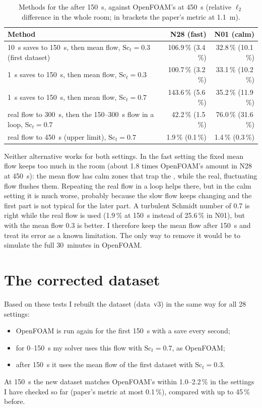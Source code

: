 \begin{table}[h]
  \centering
  \caption{Methods for the \cotwo{} after 150~s, against OpenFOAM's \cotwo{} at 450~s (relative $\ell_2$
  difference in the whole room; in brackets the paper's metric at 1.1~m).}
  \label{tab:after150}
  \small
  \begin{tabular}{>{\raggedright}p{8.2cm}rr}
    \toprule
    Method & N28 (fast) & N01 (calm)\\
    \midrule
    10~s saves to 150~s, then mean flow, $\mathrm{Sc}_t=0.3$ (first dataset) & 106.9\,\% (3.4\,\%) & 32.8\,\% (10.1\,\%)\\
    1~s saves to 150~s, then mean flow, $\mathrm{Sc}_t=0.3$ & 100.7\,\% (3.2\,\%) & 33.1\,\% (10.2\,\%)\\
    1~s saves to 150~s, then mean flow, $\mathrm{Sc}_t=0.7$ & 143.6\,\% (5.6\,\%) & 35.2\,\% (11.9\,\%)\\
    real flow to 300~s, then the 150--300~s flow in a loop, $\mathrm{Sc}_t=0.7$ & 42.2\,\% (1.5\,\%) & 76.0\,\% (31.6\,\%)\\
    real flow to 450~s (upper limit), $\mathrm{Sc}_t=0.7$ & 1.9\,\% (0.1\,\%) & 1.4\,\% (0.3\,\%)\\
    \bottomrule
  \end{tabular}
\end{table}

Neither alternative works for both settings. In the fast setting the fixed mean flow keeps too much
\cotwo{} in the room (about 1.8 times OpenFOAM's amount in N28 at 450~s): the mean flow has calm zones that trap the
\cotwo{}, while the real, fluctuating flow flushes them. Repeating the real flow in a loop helps there, but in
the calm setting it is much worse, probably because the slow flow keeps changing and the first part is not
typical for the later part. A turbulent Schmidt number of 0.7 is right while the real flow is used
(1.9\,\% at 150~s instead of 25.6\,\% in N01), but with the mean flow 0.3 is better. I therefore keep the mean
flow after 150~s and treat its error as a known limitation. The only way to remove it would be to simulate
the full 30~minutes in OpenFOAM.

\section{The corrected dataset}
Based on these tests I rebuilt the dataset (data~v3) in the same way for all 28 settings:
\begin{itemize}
  \item OpenFOAM is run again for the first 150~s with a save every second;
  \item for 0--150~s my solver uses this flow with $\mathrm{Sc}_t=0.7$, as OpenFOAM;
  \item after 150~s it uses the mean flow of the first dataset with $\mathrm{Sc}_t=0.3$.
\end{itemize}
At 150~s the new dataset matches OpenFOAM's \cotwo{} within 1.0--2.2\,\% in the settings I have checked so far (paper's
metric at most 0.1\,\%), compared with up to 45\,\% before. 

